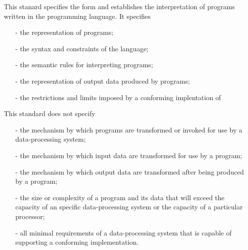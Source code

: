 This stanard specifies the form and establishes the interpretation of programs written in the \lP programming language.
It specifies
\begin{itemize}
\item[-] the representation of \lP programs;
\item[-] the syntax and constraints of the \lP language;
\item[-] the semantic rules for interpreting \lP programs;
\item[-] the representation of output data produced by \lP programs;
\item[-] the restrictions and limits imposed by a conforming implentation of \lP
\end{itemize}

This standard does not specify
\begin{itemize}
\item[-] the mechanism by which \lP programs are transformed or invoked for use by a data-processing system;
\item[-] the mechanism by which input data are transformed for use by a \lP program;
\item[-] the mechanism by which output data are transformed after being produced by a \lP program;
\item[-] the size or complexity of a program and its data that will exceed the capacity of an specific data-processing system or the capacity of a particular processor;
\item[-] all minimal requirements of a data-processing system that is capable of supporting a conforming implementation.
\end{itemize}